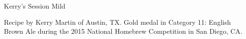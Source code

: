 \begin{recipe}{Kerry's Session Mild} %

\begin{aboutblock}
Recipe by Kerry Martin of Austin, TX. Gold medal in Category 11: English Brown
Ale during the 2015 National Homebrew Competition in San Diego, CA.
\sourceaha
\end{aboutblock}


\begin{methodandtiming}

\begin{mashsteps}
\end{mashsteps}

\begin{fermentationsteps}
\end{fermentationsteps}

\end{methodandtiming}

\recipebreak

\begin{ingredientsblock}

\begin{malts}
\end{malts}

\begin{hops}
\end{hops}


\end{ingredientsblock}

\end{recipe}

